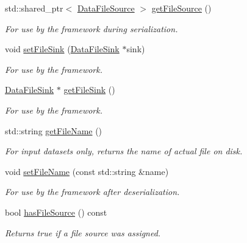 \begin{DoxyCompactItemize}
std::shared\_\-ptr$<$ \hyperlink{classBUSBOY_1_1DataFileSource}{DataFileSource} $>$ \hyperlink{classBUSBOY_1_1DataFile_a27a3668a62a4ab98e670eba28e3dc9e2}{getFileSource} ()
\begin{DoxyCompactList}\small\item\em For use by the framework during serialization. \item\end{DoxyCompactList}\item 
void \hyperlink{classBUSBOY_1_1DataFile_ac1bc9a0297a076719033d83586c7e992}{setFileSink} (\hyperlink{classBUSBOY_1_1DataFileSink}{DataFileSink} $\ast$sink)
\begin{DoxyCompactList}\small\item\em For use by the framework. \item\end{DoxyCompactList}\item 
\hyperlink{classBUSBOY_1_1DataFileSink}{DataFileSink} $\ast$ \hyperlink{classBUSBOY_1_1DataFile_a11dfcd0992564133e0e35aa5badc6dcb}{getFileSink} ()
\begin{DoxyCompactList}\small\item\em For use by the framework. \item\end{DoxyCompactList}\item 
std::string \hyperlink{classBUSBOY_1_1DataFile_abde2b0c80581b418b9bd2fa70e865e05}{getFileName} ()
\begin{DoxyCompactList}\small\item\em For input datasets only, returns the name of actual file on disk. \item\end{DoxyCompactList}\item 
void \hyperlink{classBUSBOY_1_1DataFile_a9c9f9d2cfcc56e363c88b9f95e6b71b9}{setFileName} (const std::string \&name)
\begin{DoxyCompactList}\small\item\em For use by the framework after deserialization. \item\end{DoxyCompactList}\item 
bool \hyperlink{classBUSBOY_1_1DataFile_aa91fcade9e4c1c1f40eb4725463eecc2}{hasFileSource} () const 
\begin{DoxyCompactList}\small\item\em Returns true if a file source was assigned. \item\end{DoxyCompactList}\item 

\end{DoxyCompactItemize}
